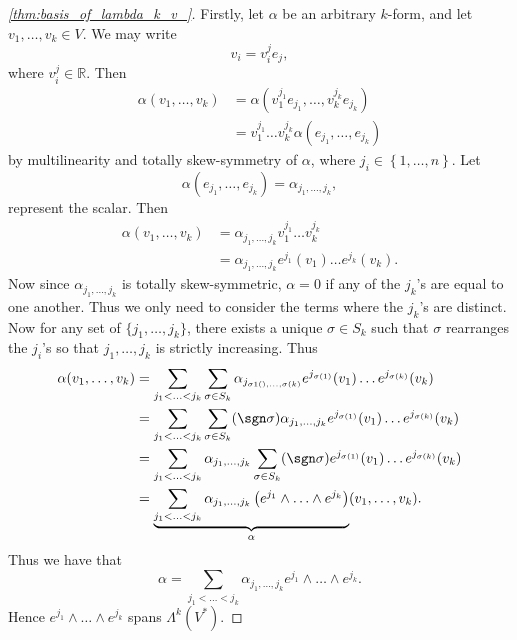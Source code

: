 \documentclass[notoc,notitlepage]{tufte-book}
\begin{document}
\begin{proof}[\cref{thm:basis_of_lambda_k_v_}]
  Firstly, let $\alpha$ be an arbitrary $k$-form, and let $v_1, \ldots, v_k \in V$. We
  may write
  \begin{equation*}
    v_i = v_i^j e_j,
  \end{equation*}
  where $v_i^j \in \mathbb{R}$. Then
  \begin{align*}
    \alpha(v_1, \ldots, v_k) &= \alpha\left(v_1^{j_1} e_{j_1}, \ldots, v_k^{j_k} e_{j_k}\right) \\
                             &= v_1^{j_1} \hdots v_k^{j_k} \alpha ( e_{j_1}, \ldots, e_{j_k} )
  \end{align*}
  by multilinearity and totally skew-symmetry of $\alpha$, where
  $j_i \in \left\{ 1, \ldots, n \right\}$. Let
  \begin{equation}\label{eq:another_alt_of_a_k_form_scalar}
    \alpha(e_{j_1}, \ldots, e_{j_k}) = \alpha_{j_1, \ldots, j_k},
  \end{equation}
  represent the scalar. Then
  \begin{align*}
    \alpha(v_1, \ldots, v_k) &= \alpha_{j_1, \ldots, j_k} v_1^{j_1} \hdots v_k^{j_k} \\
                             &= \alpha_{j_1, \ldots, j_k} e^{j_1}(v_1) \hdots e^{j_k}(v_k).
  \end{align*}
  Now since $\alpha_{j_1, \ldots, j_k}$ is totally skew-symmetric, $\alpha = 0$ if any of the
  $j_k$'s are equal to one another. Thus we only need to consider the terms where the $j_k$'s
  are distinct. Now for any set of $\{ j_1, \ldots, j_k \}$, there exists a unique
  $\sigma \in S_k$ such that $\sigma$ rearranges the $j_i$'s so that $j_1, \ldots, j_k$ is
  strictly increasing. Thus
  \begin{align*}
    \alpha(v_1, \ldots, v_k)
      &= \sum_{j_1 < \hdots < j_k} \sum_{\sigma \in S_k} \alpha_{j_{\sigma1(), \ldots, \sigma(k)}}
        e^{j_{\sigma(1)}} (v_1) \hdots e^{j_{\sigma(k)}} (v_k) \\
      &= \sum_{j_1 < \hdots < j_k} \sum_{\sigma \in S_k} (\sgn \sigma) \alpha_{j_1, \ldots, j_k}
        e^{j_{\sigma(1)}} (v_1) \hdots e^{j_{\sigma(k)}} (v_k) \\
      &= \sum_{j_1 < \hdots < j_k} \alpha_{j_1, \ldots, j_k} \sum_{\sigma \in S_k} (\sgn \sigma)
        e^{j_{\sigma(1)}} (v_1) \hdots e^{j_{\sigma(k)}} (v_k) \\
      &= \underbrace{ \sum_{j_1 < \hdots < j_k}
          \alpha_{j_1, \ldots, j_k} \left( e^{j_1} \land \hdots \land e^{j_k} \right)
        }_{\alpha}
        (v_1, \ldots, v_k).
  \end{align*}
  Thus we have that
  \begin{equation}\label{eq:k_form_in_general}
    \alpha = \sum_{j_1 < \hdots < j_k} \alpha_{j_1, \ldots, j_k} e^{j_1} \land \hdots \land e^{j_k}.
  \end{equation}
  Hence $e^{j_1} \land \hdots \land e^{j_k}$ spans $\Lambda^k(V^*)$.


\end{proof}
\end{document}
